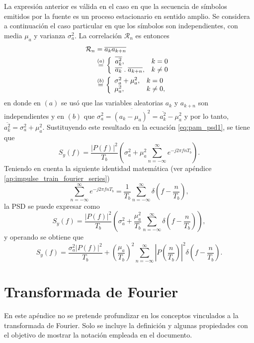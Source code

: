 \documentclass[a4paper]{article}
\begin{document}
La expresión anterior es válida en el caso en que la secuencia de símbolos emitidos por la fuente es un proceso estacionario en sentido amplio. Se considera a continuación el caso particular en que los símbolos son independientes, con media \(\mu_a\) y varianza \(\sigma_a^2\). La correlación \(\mathcal{R}_n\) es entonces
\begin{align*}
\mathcal{R}_n&= \overline{a_ka_{k+n}}\\
&\overset{(a)}{=}\left\{ 
\begin{array}{l l}
\overline{a_k^2}, & k=0\\
\overline{a_k}\;.\;\overline{a_{k+n}}, & k\neq0 \end{array} \right.\\
&\overset{(b)}{=}\left\{ 
\begin{array}{l l}
\sigma_a^2+\mu_a^2, & k=0\\
\mu_a^2, & k\neq0, \end{array} \right.
\end{align*}
en donde en \((a)\) se usó que las variables aleatorias \(a_k\) y \(a_{k+n}\) son independientes y en \((b)\) que \(\sigma_a^2= \overline{(a_k-\mu_a)^2}=\overline{a^2_k}-\mu_a^2\) y por lo tanto, \(\overline{a^2_k}=\sigma_a^2+\mu_a^2\).
Sustituyendo este resultado en la ecuación \ref{eq:pam_psd1}, se tiene que
\[
S_y(f)=\frac{|P(f)|^2}{T_b}\left(\sigma_a^2+\mu_a^2\sum_{n=-\infty}^{\infty}e^{-j2\pi fnT_b}\right).
\]
Teniendo en cuenta la siguiente identidad matemática (ver apéndice \ref{ap:impulse_train_fourier_series})
\[
\sum_{n=-\infty}^{\infty}e^{-j2\pi fnT_b}=\frac{1}{T_b}\sum_{n=-\infty}^{\infty}\delta\left(f-\frac{n}{T_b}\right),
\]
la PSD se puede expresar como
\[
S_y(f)=\frac{|P(f)|^2}{T_b}\left(\sigma_a^2+\frac{\mu_a^2}{T_b}\sum_{n=-\infty}^{\infty}\delta\left(f-\frac{n}{T_b}\right)\right),
\]
y operando se obtiene que
\[
S_y(f)=\frac{\sigma_a^2|P(f)|^2}{T_b}+\left(\frac{\mu_a}{T_b}\right)^2\sum_{n=-\infty}^{\infty}\left|P\left(\frac{n}{T_b}\right)\right|^2\delta\left(f-\frac{n}{T_b}\right).
\]

\newpage

\appendix

\section{Transformada de Fourier}\label{ap:fourier_transform}

En este apéndice no se pretende profundizar en los conceptos vinculados a la transformada de Fourier. Solo se incluye la definición y algunas propiedades con el objetivo de mostrar la notación empleada en el documento.
\end{document}
